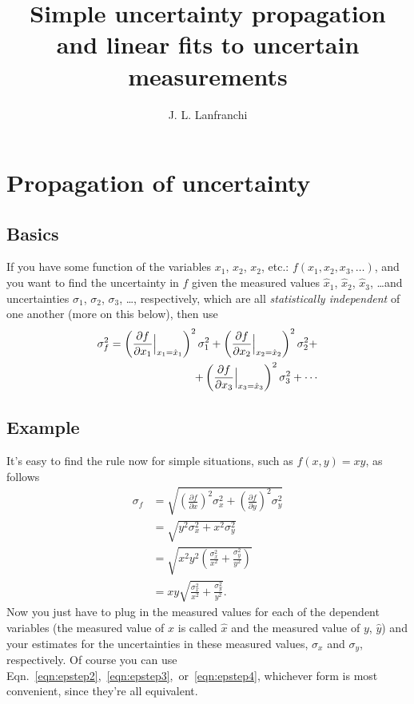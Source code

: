 \documentclass[10pt,letterpaper,twoside]{article}
\author{J. L. Lanfranchi}
\title{Simple uncertainty propagation and linear fits to uncertain measurements}
\begin{document}
 
\twocolumn
\maketitle

\section{Propagation of uncertainty}
\subsection{Basics}
If you have some function of the variables $x_1$, $x_2$, $x_2$, etc.: $f(x_1,x_2,x_3,\dots)$, and you want to find the uncertainty in $f$ given the measured values $\hat x_{1}$, $\hat x_{2}$, $\hat x_{3}$, \dots and uncertainties $\sigma_{1}$, $\sigma_{2}$, $\sigma_{3}$, \dots, respectively, which are all \textit{statistically independent} of one another (more on this below), then use
\begin{align}
  \sigma_f^2 = \left(\frac{\partial f}{\partial x_1}\Big|_{x_1=\hat x_1}\right)^2\sigma_1^2 +
  \left(\frac{\partial f}{\partial x_2}\Big|_{x_2=\hat x_2}\right)^2\sigma_2^2 + \label{eqn:errorprop}\\
   + \left(\frac{\partial f}{\partial x_3}\Big|_{x_3=\hat x_3}\right)^2\sigma_3^2 + \cdots \notag
\end{align}
\subsection{Example}
It's easy to find the rule now for simple situations, such as $f(x,y)=x y$, as follows
\begin{align}
  \sigma_f &= \sqrt{\left(\frac{\partial f}{\partial x}\right)^2\sigma_x^2 +
  \left(\frac{\partial f}{\partial y}\right)^2\sigma_y^2 } \label{eqn:epstep1} \\
   &= \sqrt{y^2\sigma_x^2 + x^2\sigma_y^2 } \label{eqn:epstep2} \\
   &= \sqrt{x^2y^2\left( \frac{\sigma_x^2}{x^2} + \frac{\sigma_y^2}{y^2}\right) } \label{eqn:epstep3} \\
   &= xy \sqrt{ \frac{\sigma_x^2}{x^2} + \frac{\sigma_y^2}{y^2} }. \label{eqn:epstep4}
\end{align}
Now you just have to plug in the measured values for each of the dependent variables (the measured value of $x$ is called $\hat x$ and the measured value of $y$, $\hat y$) and your estimates for the uncertainties in these measured values, $\sigma_x$ and $\sigma_y$, respectively.
Of course you can use Eqn.~\ref{eqn:epstep2},~\ref{eqn:epstep3},~or~\ref{eqn:epstep4}, whichever form is most convenient, since they're all equivalent.
\end{document}
